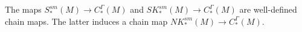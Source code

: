 \begin{comment}
Rather than maps of simplices $\Delta^k \to M$, the cubical singular chain complex, which we denote $SK_*(M)$, is generated by maps $\interval^k \to M$ with $\interval$ being the standard interval $\interval = [0,1]$ (it will be convenient henceforth to use this notation for the interval).
The boundary formula is defined so that if $\sigma: \interval^k \to M$ is a singular cube, then
\begin{equation}\label{E: cube bd}
	\bd \sigma = \sum_{i = 1}^k (-1)^i(\sigma \delta_i^0-\sigma \delta^1_i),
\end{equation}
where for $\epsilon\in\{0,1\}$, the map $\delta_i^\epsilon \colon \interval^{k-1} \to \interval^k$ is defined by
$$\delta_i^\epsilon(x_1,\ldots,x_k) = (x_1,\ldots,\epsilon,\ldots, x_k)$$
with $\epsilon$ in the $i$th slot.
The homology of the chain complex $SK_*(M)$ is not isomorphic to singular homology, as it does not satisfy the dimension axiom, so one instead forms the normalized complex $NK_*(M)$ by quotienting out the subcomplex of degenerate singular cubes, generated by singular cubes $\sigma \colon \interval^k \to M$ such that $\sigma$ does not depend on at least one of the variables.
In other words, the degenerate singular cubes are those maps $\sigma \colon \interval^k \to M$ that factor through one of the coordinate projections $\interval^k \to \interval^{k-1}$.
It then holds that $NK_*(M)$ is chain homotopy equivalent to $S_*(M)$, the complex of singular simplicial chains.
In fact, this holds for $M$ any space and not just a manifold \cite[Theorem 8.4.7]{HW60}.
Of course we will need the smooth version $NK^{sm}_*(M)$ generated by smooth singular cubes and modulo degenerate smooth singular cubes.
We defer to an appendix to this section the proof that $NK^{sm}_*(M) \into NK_*(M)$ is a chain homotopy equivalence.

As the cubes $\interval^k$ are compact manifolds with corners equipped with their standard orientations,
we have, analogously to the simplicial case, a set inclusion $SK^{sm}_i(M) \into PC_i^\Gamma(M)$ for each $i$.
\end{comment}

\begin{lemma}\label{L: singular and cubical chain maps}
	The maps $S^{sm}_*(M) \to C_*^\Gamma(M)$ and $SK^{sm}_*(M) \to C_*^\Gamma(M)$ are well-defined chain maps.
	The latter induces a chain map $NK^{sm}_*(M) \to C_*^\Gamma(M)$.
\end{lemma}


